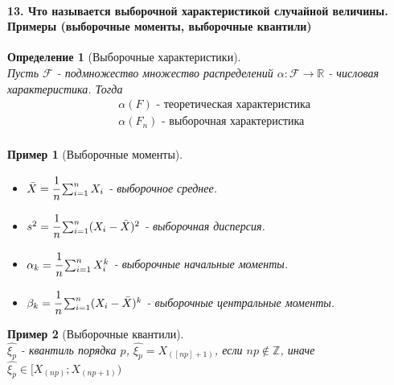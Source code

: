 \documentclass[titlepage]{article}
\newcommand{\R}{\mathbb{R}} %
\newtheorem{definition}{Определение}
\newtheorem*{example}{Пример}
\begin{document}
\paragraph{13. Что называется выборочной характеристикой случайной величины. Примеры (выборочные моменты, выборочные квантили)}
\begin{definition}[Выборочные характеристики] ~\\
	Пусть $\mathscr{F}$ - подмножество множество распределений $\alpha:\mathscr{F}\rightarrow\R$ - числовая характеристика. Тогда 
	\begin{align*}
		&\alpha(F) \text{ - теоретическая характеристика}\\
		&\alpha(F_n) \text{ - выборочная характеристика}\\
	\end{align*}
\end{definition}
\begin{example}[Выборочные моменты]~\\
	\begin{itemize}
		\item $\bar X = \cfrac{1}{n}\sum_{i=1}^nX_i$ - выборочное среднее.
		\item $s^2 = \cfrac{1}{n}\sum_{i=1}^n(X_i-\bar X)^2$ - выборочная дисперсия.
		\item $\alpha_k = \cfrac{1}{n}\sum_{i=1}^nX_i^k$ - выборочные начальные моменты.
		\item $\beta_k = \cfrac{1}{n}\sum_{i=1}^n(X_i-\bar X)^k$ - выборочные центральные моменты.
	\end{itemize}
\end{example}
\begin{example}[Выборочные квантили] ~\\
	$\hat{\xi_p}$ - квантиль порядка $p$, $\hat{\xi_{p}}=X_{([np]+1)}$, если $np\notin\mathbb{Z}$, иначе $\hat{\xi_{p}}\in [X_{(np)};X_{(np+1)})$
\end{example}
\end{document}
